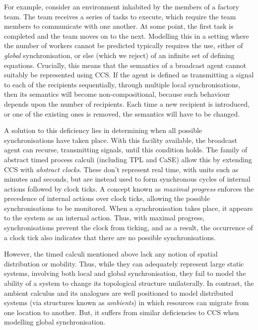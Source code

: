 For example, consider an environment inhabited by the members of a
factory team. The team receives a series of tasks to execute, which
require the team members to communicate with one another. At some point,
the first task is completed and the team moves on to the next. Modelling
this in a setting where the number of workers cannot be predicted
typically requires the use, either of \emph{global} synchronisation, or
else (which we reject) of an infinite set of defining equations.
Crucially, this means that the semantics of a broadcast agent cannot
suitably be represented using CCS.  If the agent is defined as
transmitting a signal to each of the recipients sequentially, through
multiple local synchronisations, then its semantics will become
non-compositional, because such behaviour depends upon the number of
recipients.  Each time a new recipient is introduced, or one of the
existing ones is removed, the semantics will have to be changed.

A solution to this deficiency lies in determining when all possible
synchronisations have taken place.  With this facility available, the
broadcast agent can recurse, transmitting signals, until this
condition holds. The family of abstract timed process calculi
(including TPL\cite{hennessy:tpl} and CaSE\cite{CaSE}) allow this by
extending CCS with \emph{abstract clocks}.  These don't represent real
time, with units such as minutes and seconds, but are instead used to
form synchronous cycles of internal actions followed by clock ticks.
A concept known as \emph{maximal progress} enforces the precedence of
internal actions over clock ticks, allowing the possible
synchronisations to be monitored.  When a synchronisation takes place,
it appears to the system as an internal action.  Thus, with maximal
progress, synchronisations prevent the clock from ticking, and as a
result, the occurrence of a clock tick also indicates that there are
no possible synchronisations.

However, the timed calculi mentioned above lack any notion of spatial
distribution or mobility. Thus, while they can adequately represent
large static systems, involving both local and global synchronisation,
they fail to model the ability of a system to change its topological
structure unilaterally. In contrast, the ambient calculus \cite{amb} and
its analogues are well positioned to model distributed systems (via
structures known as \emph{ambients}) in which resources can migrate from
one location to another. But, it suffers from similar deficiencies to
CCS when modelling global synchronisation.

